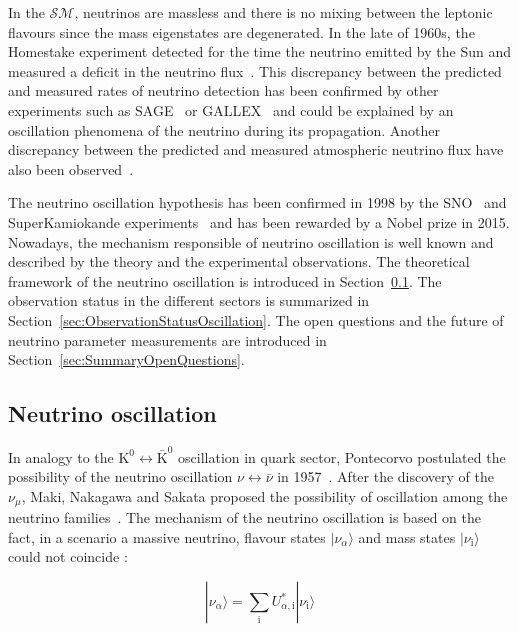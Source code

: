 \documentclass[main.tex]{subfiles}
\begin{document}
\NI In the $\mathcal{SM}$, neutrinos are massless and there is no mixing between the leptonic flavours since the mass eigenstates are degenerated. In the late of 1960s, the Homestake experiment detected for the time the neutrino emitted by the Sun and measured a deficit in the neutrino flux~\cite{Homestake}. This discrepancy between the predicted and measured rates of neutrino detection has been confirmed by other experiments such as SAGE~\cite{SAGE} or GALLEX~\cite{Gallex} and could be explained by an oscillation phenomena of the neutrino during its propagation. Another discrepancy between the predicted and measured atmospheric neutrino flux have also been observed~\cite{AtmosphericAnomaly}. 


\bigskip


\NI The neutrino oscillation hypothesis has been confirmed in 1998 by the SNO~\cite{SNO} and SuperKamiokande experiments~\cite{SK} and has been rewarded by a Nobel prize in 2015. Nowadays, the mechanism responsible of neutrino oscillation is well known and described by the theory and the experimental observations. The theoretical framework of the neutrino oscillation is introduced in Section~\ref{sec:NeutrinoOscillationTheory}. The observation status in the different sectors is summarized in Section~\ref{sec:ObservationStatusOscillation}. The open questions and the future of neutrino parameter measurements are introduced in Section~\ref{sec:SummaryOpenQuestions}.


\subsection{Neutrino oscillation}\label{sec:NeutrinoOscillationTheory}


\NI In analogy to the $\text{K}^\text{0} \leftrightarrow \bar{\text{K}}^\text{0}$ oscillation in quark sector, Pontecorvo postulated the possibility of the neutrino oscillation $\nu \leftrightarrow \bar{\nu}$ in 1957~\cite{PontecorvoOscillationProposal}. After the discovery of the $\nu_\mu$, Maki, Nakagawa and Sakata proposed the possibility of oscillation among the neutrino families~\cite{MakiNakagawaSakata}. The mechanism of the neutrino oscillation is based on the fact, in a scenario a massive neutrino, flavour states $|\nu_\alpha \rangle$ and mass states $|\nu_\text{i} \rangle$ could not coincide : 


\begin{equation}\label{eq:RelationEigenStateMassFlavor}
 |\nu_\alpha \rangle = \sum_\text{i} U_{\alpha,\text{i}}^{*} |\nu_\text{i} \rangle
\end{equation}
\end{document}

